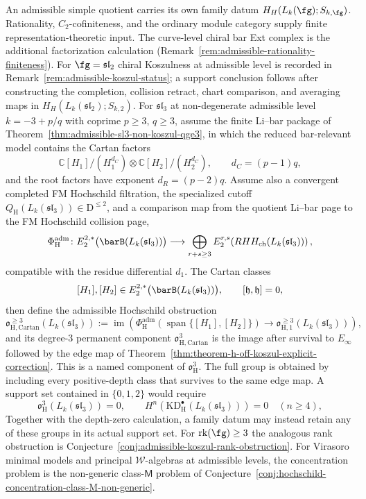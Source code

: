 \begin{theorem}
\label{thm:theorem-h-singular-quotient-firewall}
An admissible simple quotient carries its own family datum
$H_H(L_k(\fg);S_{k,\fg})$.  Rationality, $C_2$-cofiniteness, and the
ordinary module category supply finite representation-theoretic input.
The curve-level chiral bar Ext complex is the additional
factorization calculation
\textup{(}Remark~\ref{rem:admissible-rationality-finiteness}\textup{)}.
For $\fg=\mathfrak{sl}_2$ chiral Koszulness at admissible level is
recorded in Remark~\ref{rem:admissible-koszul-status}; a support
conclusion follows after constructing the completion, collision
retract, chart comparison, and averaging maps in
$H_H(L_k(\mathfrak{sl}_2);S_{k,2})$. For
$\mathfrak{sl}_3$ at non-degenerate admissible level
$k=-3+p/q$ with coprime $p\geq3$, $q\geq3$, assume the finite Li--bar
package of Theorem~\ref{thm:admissible-sl3-non-koszul-qge3}, in which
the reduced bar-relevant model contains the Cartan factors
\[
 \mathbb C[H_1]/(H_1^{d_C})\otimes
 \mathbb C[H_2]/(H_2^{d_C}),
 \qquad d_C=(p-1)q,
\]
and the root factors have exponent $d_R=(p-2)q$. Assume also a
convergent completed FM Hochschild filtration, the specialized cutoff
$Q_{\mathrm H}(L_k(\mathfrak{sl}_3))\in \mathrm D^{\leq2}$, and a comparison map
from the quotient Li--bar page to the FM Hochschild collision page,
\[
 \Phi_{\mathrm H}^{\mathrm{adm}}\colon
 E_2^{2,*}\bigl(\barB(L_k(\mathfrak{sl}_3))\bigr)
 \longrightarrow
 \bigoplus_{r+s\geq3}
 E_2^{r,s}\!\left(RHH_{\mathrm{ch}}(L_k(\mathfrak{sl}_3))\right),
\]
compatible with the residue differential $d_1$. The Cartan classes
\[
 [H_1], [H_2]\in E_2^{2,*}\bigl(\barB(L_k(\mathfrak{sl}_3))\bigr),
 \qquad [\mathfrak h,\mathfrak h]=0,
\]
then define the admissible Hochschild obstruction
\[
 \mathfrak{o}_{\mathrm H,\mathrm{Cartan}}^{\ge3}(L_k(\mathfrak{sl}_3))
 :=
 \operatorname{im}\!\left(
  \Phi_{\mathrm H}^{\mathrm{adm}}\!
  \left(\operatorname{span}\{[H_1],[H_2]\}\right)
  \longrightarrow
  \mathfrak{o}_{\mathrm H,1}^{\ge3}(L_k(\mathfrak{sl}_3))
 \right),
\]
and its degree-$3$ permanent component
$\mathfrak{o}_{\mathrm H,\mathrm{Cartan}}^{3}$ is the image after
survival to $E_\infty$ followed by the edge map of
Theorem~\ref{thm:theorem-h-off-koszul-explicit-correction}. This is a
named component of $\mathfrak{o}_{\mathrm H}^{3}$.  The full group is
obtained by including every positive-depth class that survives to the
same edge map.  A support set contained in $\{0,1,2\}$ would require
\[
 \mathfrak{o}_{\mathrm H}^{3}(L_k(\mathfrak{sl}_3))=0,\qquad
 H^n(\mathrm{KD}_{\mathrm H}^{\bullet}(L_k(\mathfrak{sl}_3)))=0
 \quad(n\geq4),
\]
Together with the depth-zero calculation, a family datum may instead
retain any of these groups in its actual support set. For
$\mathrm{rk}(\fg)\geq3$ the analogous rank obstruction is
Conjecture~\ref{conj:admissible-koszul-rank-obstruction}. For
Virasoro minimal models and principal $\mathcal W$-algebras at
admissible levels, the concentration problem is the non-generic
class-\(\mathsf M\) problem of
Conjecture~\ref{conj:hochschild-concentration-class-M-non-generic}.
\end{theorem}

